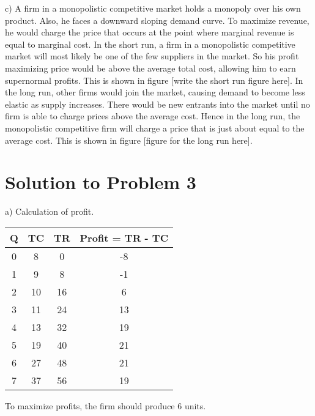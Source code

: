 \documentclass[12pt]{article}
\begin{document}
c) A firm in a monopolistic competitive market holds a monopoly over his own product. Also, he faces a downward sloping demand curve. To maximize revenue, he would charge the price that occurs at the point where marginal revenue is equal to marginal cost.  
In the short run, a firm in a monopolistic competitive market will most likely be one of the few suppliers in the market. So his profit maximizing price would be above the average total cost, allowing him to earn supernormal profits. This is shown in figure [write the short run figure here].
In the long run, other firms would join the market, causing demand to become less elastic as supply increases. There would be new entrants into the market until no firm is able to charge prices above the average cost. Hence in the long run, the monopolistic competitive firm will charge a price that is just about equal to the average cost. This is shown in figure [figure for the long run here].
\clearpage


\section*{Solution to Problem 3}

a) Calculation of profit.
\begin{center}
	\begin{tabular}{|c|c|c|c|}
		\hline
		Q  & TC & TR &  Profit = TR - TC \\
		\hline
		0  & 8  & 0  &  -8\\
		1  & 9  & 8  & -1\\
		2  & 10 & 16 & 6\\
		3  & 11 & 24 & 13\\
		4  & 13 & 32 & 19\\
		5  & 19 & 40 & 21\\
		6  & 27 & 48 & 21\\
		7  & 37 & 56 & 19\\
		\hline
	\end{tabular}
\end{center}

To maximize profits, the firm should produce 6 units.
\end{document}
